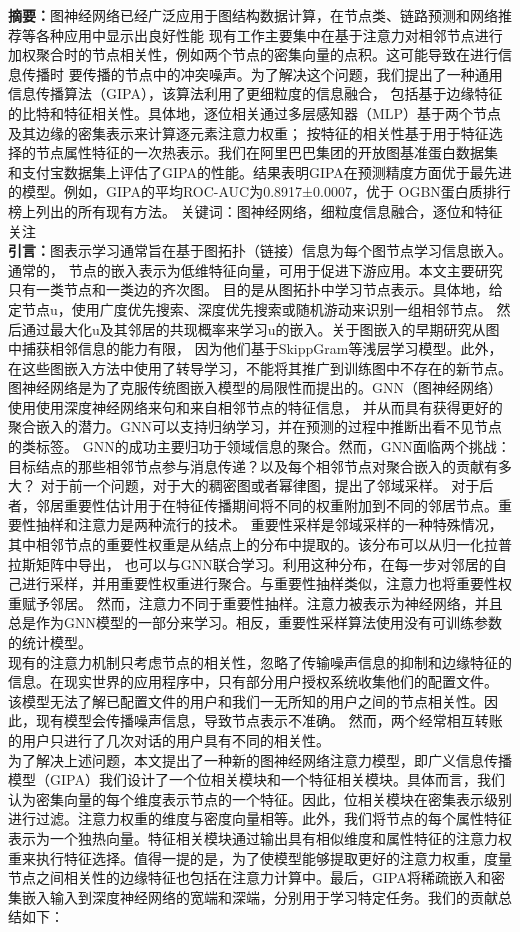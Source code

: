 \documentclass{article}
\begin{document}
\textbf{摘要：}图神经网络已经广泛应用于图结构数据计算，在节点类、链路预测和网络推荐等各种应用中显示出良好性能
现有工作主要集中在基于注意力对相邻节点进行加权聚合时的节点相关性，例如两个节点的密集向量的点积。这可能导致在进行信息传播时
要传播的节点中的冲突噪声。为了解决这个问题，我们提出了一种通用信息传播算法（GIPA），该算法利用了更细粒度的信息融合，
包括基于边缘特征的比特和特征相关性。具体地，逐位相关通过多层感知器（MLP）基于两个节点及其边缘的密集表示来计算逐元素注意力权重；
按特征的相关性基于用于特征选择的节点属性特征的一次热表示。我们在阿里巴巴集团的开放图基准蛋白数据集
和支付宝数据集上评估了GIPA的性能。结果表明GIPA在预测精度方面优于最先进的模型。例如，GIPA的平均ROC-AUC为0.8917±0.0007，优于
OGBN蛋白质排行榜上列出的所有现有方法。
关键词：图神经网络，细粒度信息融合，逐位和特征关注\\

\textbf{引言：}图表示学习通常旨在基于图拓扑（链接）信息为每个图节点学习信息嵌入。通常的，
节点的嵌入表示为低维特征向量，可用于促进下游应用。本文主要研究只有一类节点和一类边的齐次图。
目的是从图拓扑中学习节点表示。具体地，给定节点u，使用广度优先搜索、深度优先搜索或随机游动来识别一组相邻节点。
然后通过最大化u及其邻居的共现概率来学习u的嵌入。关于图嵌入的早期研究从图中捕获相邻信息的能力有限，
因为他们基于SkippGram等浅层学习模型。此外，在这些图嵌入方法中使用了转导学习，不能将其推广到训练图中不存在的新节点。\\
图神经网络是为了克服传统图嵌入模型的局限性而提出的。GNN（图神经网络）使用使用深度神经网络来句和来自相邻节点的特征信息，
并从而具有获得更好的聚合嵌入的潜力。GNN可以支持归纳学习，并在预测的过程中推断出看不见节点的类标签。
GNN的成功主要归功于领域信息的聚合。然而，GNN面临两个挑战：目标结点的那些相邻节点参与消息传递？以及每个相邻节点对聚合嵌入的贡献有多大？
对于前一个问题，对于大的稠密图或者幂律图，提出了邻域采样。
对于后者，邻居重要性估计用于在特征传播期间将不同的权重附加到不同的邻居节点。重要性抽样和注意力是两种流行的技术。
重要性采样是邻域采样的一种特殊情况，其中相邻节点的重要性权重是从结点上的分布中提取的。该分布可以从归一化拉普拉斯矩阵中导出，
也可以与GNN联合学习。利用这种分布，在每一步对邻居的自己进行采样，并用重要性权重进行聚合。与重要性抽样类似，注意力也将重要性权重赋予邻居。
然而，注意力不同于重要性抽样。注意力被表示为神经网络，并且总是作为GNN模型的一部分来学习。相反，重要性采样算法使用没有可训练参数的统计模型。\\
现有的注意力机制只考虑节点的相关性，忽略了传输噪声信息的抑制和边缘特征的信息。在现实世界的应用程序中，只有部分用户授权系统收集他们的配置文件。
该模型无法了解已配置文件的用户和我们一无所知的用户之间的节点相关性。因此，现有模型会传播噪声信息，导致节点表示不准确。
然而，两个经常相互转账的用户只进行了几次对话的用户具有不同的相关性。\\
为了解决上述问题，本文提出了一种新的图神经网络注意力模型，即广义信息传播模型（GIPA）我们设计了一个位相关模块和一个特征相关模块。具体而言，我们认为密集向量的每个维度表示节点的一个特征。因此，位相关模块在密集表示级别进行过滤。注意力权重的维度与密度向量相等。此外，我们将节点的每个属性特征表示为一个独热向量。特征相关模块通过输出具有相似维度和属性特征的注意力权重来执行特征选择。值得一提的是，为了使模型能够提取更好的注意力权重，度量节点之间相关性的边缘特征也包括在注意力计算中。最后，GIPA将稀疏嵌入和密集嵌入输入到深度神经网络的宽端和深端，分别用于学习特定任务。我们的贡献总结如下：
\end{document}
